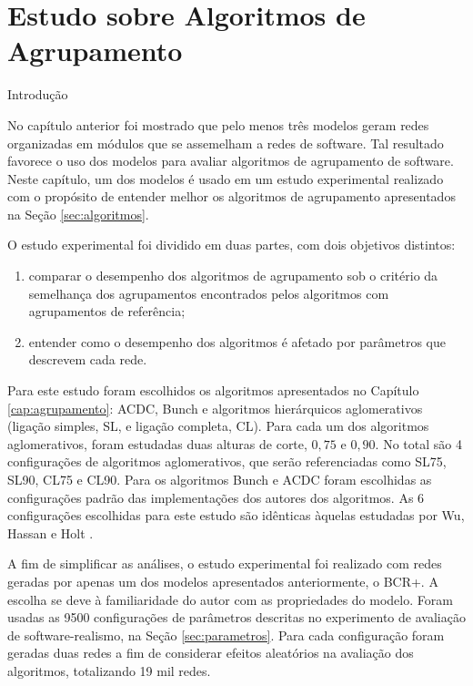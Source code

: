 
\chapter{Estudo sobre Algoritmos de Agrupamento} \label{cap:estudo}

\begin{section}{Introdução}

No capítulo anterior foi mostrado que pelo menos três modelos geram redes organizadas em módulos que se assemelham a redes de software. Tal resultado favorece o uso dos modelos para avaliar algoritmos de agrupamento de software. Neste capítulo, um dos modelos é usado em um estudo experimental realizado com o propósito de entender melhor os algoritmos de agrupamento apresentados na Seção \ref{sec:algoritmos}.

O estudo experimental foi dividido em duas partes, com dois objetivos distintos:
\begin{enumerate}
	\item comparar o desempenho dos algoritmos de agrupamento sob o critério da semelhança dos agrupamentos encontrados pelos algoritmos com agrupamentos de referência;
	\item entender como o desempenho dos algoritmos é afetado por parâmetros que descrevem cada rede.
\end{enumerate}

Para este estudo foram escolhidos os algoritmos apresentados no Capítulo \ref{cap:agrupamento}: ACDC, Bunch e algoritmos hierárquicos aglomerativos (ligação simples, SL, e ligação completa, CL). Para cada um dos algoritmos aglomerativos, foram estudadas duas alturas de corte, $0,75$ e $0,90$. No total são 4 configurações de algoritmos aglomerativos, que serão referenciadas como SL75, SL90, CL75 e CL90. Para os algoritmos Bunch e ACDC foram escolhidas as configurações padrão das implementações dos autores dos algoritmos. As 6 configurações escolhidas para este estudo são idênticas àquelas estudadas por Wu, Hassan e Holt \cite{Wu2005}.

A fim de simplificar as análises, o estudo experimental foi realizado com redes geradas por apenas um dos modelos apresentados anteriormente, o BCR+. A escolha se deve à familiaridade do autor com as propriedades do modelo. Foram usadas as 9500 configurações de parâmetros descritas no experimento de avaliação de software-realismo, na Seção \ref{sec:parametros}. Para cada configuração foram geradas duas redes a fim de considerar efeitos aleatórios na avaliação dos algoritmos, totalizando 19 mil redes.


\end{section}

